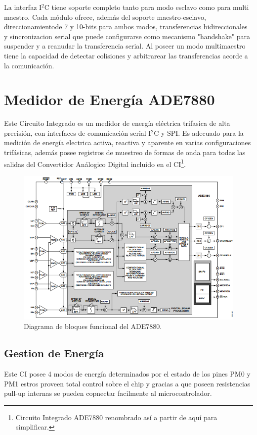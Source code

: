 \documentclass[letterpaper,12pt,oneside]{book}
\begin{document}
		La interfaz I$^2$C tiene soporte completo tanto para modo esclavo como para multi maestro. Cada módulo ofrece, además del soporte maestro-esclavo, direccionamientode 7 y 10-bits para ambos modos, transferencias bidireccionales y sincronizacion serial que puede configurarse como mecanismo "handshake" para suspender y a reanudar la transferencia serial. Al poseer un modo multimaestro tiene la capacidad de detectar colisiones y arbitrarear las transferencias acorde a la comunicación.
		\section{Medidor de Energía ADE7880}
		Este Circuito Integrado es un medidor de energía eléctrica trifasica de alta precisión, con interfaces de comunicación serial I$^2$C y SPI. Es adecuado para la medición de energía electrica activa, reactiva y aparente en varias configuraciones trifásicas, además posee registros de muestreo de formas de onda para todas las salidas del Convertidor Análogico Digital incluido en el CI\footnote{Circuito Integrado ADE7880 renombrado así a partir de aquí para simplificar.}.

		\begin{figure}[!htpb]
			\centering
			\includegraphics[scale = 0.8]{Material de Consulta/ADE7880FuncDiag.PNG}
			\caption[Diagrama de Bloques del ADE7880]{Diagrama de bloques funcional del ADE7880.}
			\label{FuncDiag}
		\end{figure}

			\subsection{Gestion de Energía}
			Este CI posee 4 modos de energía determinados por el estado de los pines PM0 y PM1 estros proveen total control sobre el chip y gracias a que poseen resistencias pull-up internas se pueden copnectar facilmente al microcontrolador.
\end{document}
